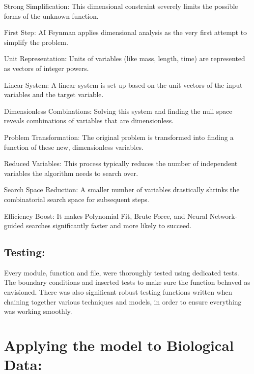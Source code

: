 \documentclass{article}
\begin{document}
    Strong Simplification: This dimensional constraint severely limits the possible forms of the unknown function.

    First Step: AI Feynman applies dimensional analysis as the very first attempt to simplify the problem.

    Unit Representation: Units of variables (like mass, length, time) are represented as vectors of integer powers.

    Linear System: A linear system is set up based on the unit vectors of the input variables and the target variable.

    Dimensionless Combinations: Solving this system and finding the null space reveals combinations of variables that are dimensionless.

    Problem Transformation: The original problem is transformed into finding a function of these new, dimensionless variables.

    Reduced Variables: This process typically reduces the number of independent variables the algorithm needs to search over.

    Search Space Reduction: A smaller number of variables drastically shrinks the combinatorial search space for subsequent steps.

    Efficiency Boost: It makes Polynomial Fit, Brute Force, and Neural Network-guided searches significantly faster and more likely to succeed.\\



\subsection{Testing: }
Every module, function and file, were thoroughly tested using dedicated tests. The boundary conditions and inserted tests to make sure the function behaved as envisioned. There was also significant robust testing functions written when chaining together various techniques and models, in order to ensure everything was working smoothly.\\ 













\section{ Applying the model to Biological Data: }
\end{document}

